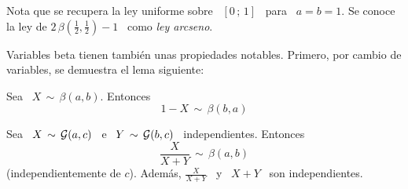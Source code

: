 Nota que se recupera la  ley uniforme sobre \ $[0 \, ; \, 1]$ \  para \ $a = b =
1$. Se conoce la ley de $ 2 \, \beta\left( \frac12 , \frac12 \right) - 1$ \ como
{\em ley arcseno}.

Variables beta  tienen tambi\'en unas propiedades notables.  Primero, por cambio
de variables, se demuestra el lema siguiente:
%
\begin{lema}[Reflexividad]
\label{Lem:MP:ReflexividadBeta}
%
  Sea \ $X \, \sim \, \beta(a,b)$. Entonces
  \[
  1-X \, \sim \, \beta(b,a)
  \]
\end{lema}
%
\begin{lema}
\label{Lem:MP:VinculoBetaGamma}
%
  Sea  \   $X  \,  \sim  \,   \mathcal{G}(a,c)$  \  e  \   $Y  \,  \sim   \,  \mathcal{G}(b,c)$  \
  independientes. Entonces
  \[
  \frac{X}{X+Y} \, \sim \, \beta(a,b)
  \]
  (independientemente  de $c$).   Adem\'as, $\frac{X}{X+Y}$  \ y  \ $X+Y$  \ son
  independientes.
\end{lema}
%
